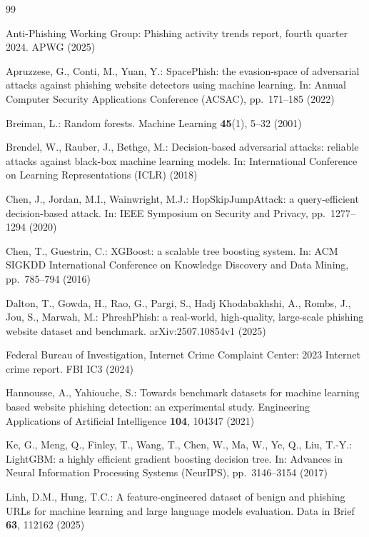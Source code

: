 \documentclass[runningheads]{llncs}
\begin{document}
\begin{thebibliography}{99}

Anti-Phishing Working Group: Phishing activity trends report, fourth quarter
2024. APWG (2025)

Apruzzese, G., Conti, M., Yuan, Y.: SpacePhish: the evasion-space of adversarial
attacks against phishing website detectors using machine learning. In: Annual
Computer Security Applications Conference (ACSAC), pp.~\mbox{171--185} (2022)

Breiman, L.: Random forests. Machine Learning \textbf{45}(1), 5--32 (2001)

Brendel, W., Rauber, J., Bethge, M.: Decision-based adversarial attacks: reliable
attacks against black-box machine learning models. In: International Conference
on Learning Representations (ICLR) (2018)

Chen, J., Jordan, M.I., Wainwright, M.J.: HopSkipJumpAttack: a query-efficient
decision-based attack. In: IEEE Symposium on Security and Privacy, pp.~\mbox{1277--1294} (2020)

Chen, T., Guestrin, C.: XGBoost: a scalable tree boosting system. In: ACM SIGKDD
International Conference on Knowledge Discovery and Data Mining, pp.~\mbox{785--794}
(2016)

Dalton, T., Gowda, H., Rao, G., Pargi, S., Hadj Khodabakhshi, A., Rombs, J.,
Jou, S., Marwah, M.: PhreshPhish: a real-world, high-quality, large-scale phishing
website dataset and benchmark. arXiv:2507.10854v1 (2025)

Federal Bureau of Investigation, Internet Crime Complaint Center: 2023 Internet
crime report. FBI IC3 (2024)

Hannousse, A., Yahiouche, S.: Towards benchmark datasets for machine learning
based website phishing detection: an experimental study. Engineering Applications
of Artificial Intelligence \textbf{104}, 104347 (2021)

Ke, G., Meng, Q., Finley, T., Wang, T., Chen, W., Ma, W., Ye, Q., Liu, \mbox{T.-Y.}:
LightGBM: a highly efficient gradient boosting decision tree. In: Advances in
Neural Information Processing Systems (NeurIPS), pp.~\mbox{3146--3154} (2017)

Linh, D.M., Hung, T.C.: A feature-engineered dataset of benign and phishing URLs
for machine learning and large language models evaluation. Data in Brief
\textbf{63}, 112162 (2025)


\end{thebibliography}
\end{document}
